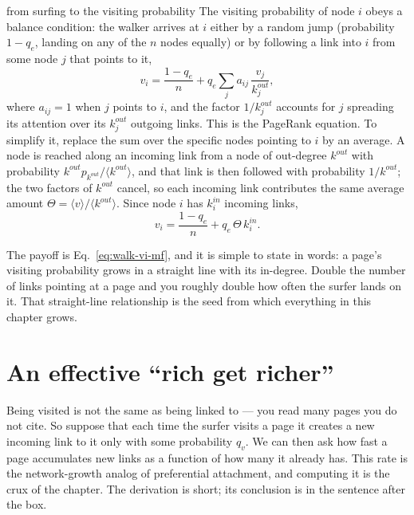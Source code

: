 \begin{calculation}{from surfing to the visiting probability}
The visiting probability of node $i$ obeys a balance condition: the walker
arrives at $i$ either by a random jump (probability $1-q_e$, landing on any of
the $n$ nodes equally) or by following a link into $i$ from some node $j$ that
points to it,
\begin{equation}
  v_i = \frac{1-q_e}{n} + q_e \sum_j a_{ij}\, \frac{v_j}{k^{out}_j},
  \label{eq:walk-pagerank}
\end{equation}
where $a_{ij}=1$ when $j$ points to $i$, and the factor $1/k^{out}_j$ accounts
for $j$ spreading its attention over its $k^{out}_j$ outgoing links. This is the
PageRank equation. To simplify it, replace the sum over the specific nodes
pointing to $i$ by an average. A node is reached along an incoming link from a
node of out-degree $k^{out}$ with probability $k^{out} p_{k^{out}}/\langle
k^{out}\rangle$, and that link is then followed with probability $1/k^{out}$; the
two factors of $k^{out}$ cancel, so each incoming link contributes the same
average amount $\Theta = \langle v\rangle/\langle k^{out}\rangle$. Since node $i$
has $k^{in}_i$ incoming links,
\begin{equation}
  v_i = \frac{1-q_e}{n} + q_e\, \Theta\, k^{in}_i.
  \label{eq:walk-vi-mf}
\end{equation}
\end{calculation}

The payoff is Eq.~\eqref{eq:walk-vi-mf}, and it is simple to state in words: a
page's visiting probability grows in a straight line with its in-degree. Double
the number of links pointing at a page and you roughly double how often the
surfer lands on it. That straight-line relationship is the seed from which
everything in this chapter grows.

\section{An effective ``rich get richer''}

Being visited is not the same as being linked to --- you read many pages you do
not cite. So suppose that each time the surfer visits a page it creates a new
incoming link to it only with some probability $q_v$. We can then ask how fast a
page accumulates new links as a function of how many it already has. This rate
is the network-growth analog of preferential attachment, and computing it is the
crux of the chapter. The derivation is short; its conclusion is in the sentence
after the box.

